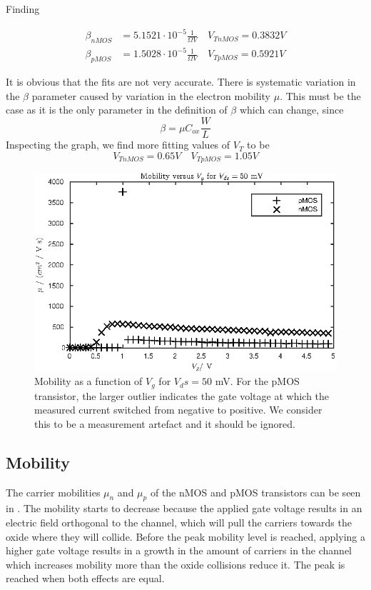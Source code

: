 Finding

\begin{align*}
    \beta_{nMOS} &= 5.1521\cdot 10^{-5} \frac{1}{\Omega V} \quad V_{TnMOS} = 0.3832 V \\
    \beta_{pMOS} &= 1.5028\cdot 10^{-5} \frac{1}{\Omega V} \quad V_{TpMOS} = 0.5921 V
\end{align*}

It is obvious that the fits are not very accurate. There is systematic variation in the \(\beta\) parameter
caused by variation in the electron mobility \(\mu\). This must be the case as it is the only parameter in the
definition of \(\beta\) which can change, since
\begin{equation*}
    \beta = \mu C_{ox} \frac{W}{L}
\end{equation*}
Inspecting the graph, we find more fitting values of \(V_T\) to be
\begin{equation*}
    V_{TnMOS} = 0.65 V \quad V_{TpMOS} = 1.05 V
\end{equation*}
\begin{figure}
    \center
    \includegraphics{extra.eps}
    \caption{Mobility as a function of \(V_g\) for \(V_ds = 50\) mV. For the pMOS transistor, the larger outlier indicates the
    gate voltage at which the measured current switched from negative to positive. We consider this to be a measurement artefact and it should
be ignored.}
    \label{fig:extra}
\end{figure}
\subsection{Mobility}
The carrier mobilities \(\mu_n\) and \(\mu_p\) of the nMOS and pMOS transistors can be seen in . 
The mobility starts to decrease because the applied gate voltage results in an electric field orthogonal to the 
channel, which will pull the carriers towards the oxide where they will collide. Before the peak mobility level is reached,
applying a higher gate voltage results in a growth in the amount of carriers in the channel which increases mobility
more than the oxide collisions reduce it. The peak is reached when both effects are equal.

